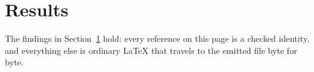 \documentclass{article}
\begin{document}
\section{Results}\label{sec:results}

The findings in Section~\ref{sec:results} hold: every reference on this
page is a checked identity, and everything else is ordinary LaTeX that
travels to the emitted file byte for byte.
\end{document}
